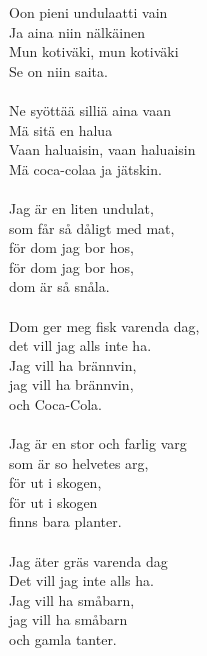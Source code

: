 
            Oon pieni undulaatti vain \\
            Ja aina niin nälkäinen \\
            Mun kotiväki, mun kotiväki \\
            Se on niin saita. \\
\hspace{10mm} \\
            Ne syöttää silliä aina vaan \\
            Mä sitä en halua \\
            Vaan haluaisin, vaan haluaisin \\
            Mä coca-colaa ja jätskin. \\
\hspace{10mm} \\
            Jag är en liten undulat, \\
            som får så dåligt med mat, \\
            för dom jag bor hos, \\
            för dom jag bor hos, \\
            dom är så snåla. \\
\hspace{10mm} \\
            Dom ger meg fisk varenda dag, \\
            det vill jag alls inte ha. \\
            Jag vill ha brännvin, \\
            jag vill ha brännvin, \\
            och Coca-Cola. \\
\hspace{10mm} \\
            Jag är en stor och farlig varg \\
            som är so helvetes arg, \\
            för ut i skogen, \\
            för ut i skogen \\
            finns bara planter. \\
\hspace{10mm} \\
            Jag äter gräs varenda dag \\
            Det vill jag inte alls ha. \\
            Jag vill ha småbarn, \\
            jag vill ha småbarn \\
            och gamla tanter. \\
